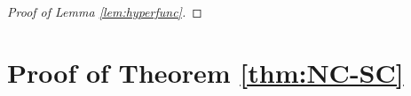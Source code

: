 \begin{proof}[Proof of Lemma \ref{lem:hyperfunc}]
\end{proof}

\section{Proof of Theorem \ref{thm:NC-SC}} \label{apx:proof-thm-SCNC}

